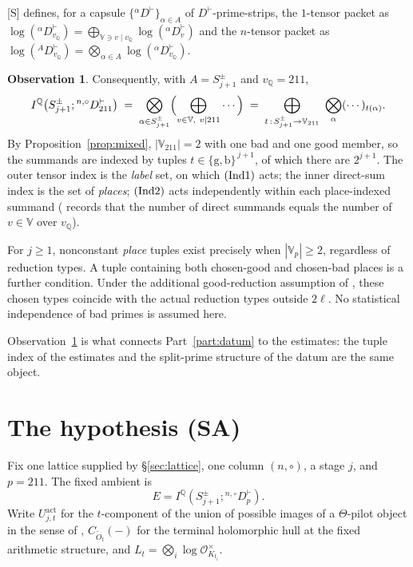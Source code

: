 \documentclass[11pt]{article}
\theoremstyle{plain}
\theoremstyle{definition}
\newtheorem{observation}[theorem]{Observation}
\newcommand{\VV}{\mathbb{V}}
\newcommand{\Ind}[1]{\textup{(Ind#1)}}
\newcommand{\SA}{\textup{(SA)}}
\begin{document}
[S] \cite[Proposition 3.2]{IUT3} defines, for a capsule $\{{}^\alpha D^\vdash\}_{\alpha\in A}$
of $D^\vdash$-prime-strips, the $1$-tensor packet as
$\log({}^\alpha D^\vdash_{v_{\mathbb{Q}}})=\bigoplus_{\VV\ni v\mid v_{\mathbb{Q}}}
\log({}^\alpha D^\vdash_v)$ and the $n$-tensor packet as
$\log({}^A D^\vdash_{v_{\mathbb{Q}}})=\bigotimes_{\alpha\in A}
\log({}^\alpha D^\vdash_{v_{\mathbb{Q}}})$.

\begin{observation}\label{obs:tuple}
Consequently, with $A=S^\pm_{j+1}$ and $v_{\mathbb{Q}}=211$,
\[
 I^{\mathbb{Q}}\bigl(S^\pm_{j+1};{}^{n,\circ}D^\vdash_{211}\bigr)
 \;=\;\bigotimes_{\alpha\in S^\pm_{j+1}}\Bigl(\bigoplus_{v\in\VV,\ v\mid211}\cdots\Bigr)
 \;=\;\bigoplus_{t\,:\,S^\pm_{j+1}\to\VV_{211}}\ \bigotimes_{\alpha}(\cdots)_{t(\alpha)} .
\]
By Proposition~\ref{prop:mixed}, $|\VV_{211}|=2$ with one bad and one good
member, so the summands are indexed by tuples
$t\in\{\mathrm{g},\mathrm{b}\}^{\,j+1}$, of which there are $2^{j+1}$.
The outer tensor index is the \emph{label} set, on which $\Ind1$ acts; the inner
direct-sum index is the set of \emph{places}; $\Ind2$ acts independently
within each place-indexed summand
(\cite[Theorem 3.11(i)]{IUT3} records that the number of direct summands equals
the number of $v\in\VV$ over $v_{\mathbb{Q}}$).
\end{observation}

For $j\ge1$, nonconstant \emph{place} tuples exist precisely when
$|\VV_p|\ge2$, regardless of reduction types.  A tuple containing both
chosen-good and chosen-bad places is a further condition.  Under the additional
good-reduction assumption of \cite[Theorem 1.10]{IUT4}, these chosen types
coincide with the actual reduction types outside $2\ell$.
No statistical independence of bad primes is assumed here.

Observation~\ref{obs:tuple} is what connects Part~\ref{part:datum} to the
estimates: the tuple index of the estimates and the split-prime structure of the
datum are the same object.

\section{The hypothesis \texorpdfstring{\SA}{(SA)}}\label{sec:sa}

Fix one lattice supplied by \S\ref{sec:lattice}, one column $(n,\circ)$,
a stage $j$, and $p=211$.  The fixed ambient is
\[
 E=I^{\mathbb{Q}}(S^\pm_{j+1};{}^{n,\circ}D^\vdash_{p}).
\]
Write $U^{\mathrm{act}}_{j,t}$ for the
$t$-component of the union of possible images of a $\Theta$-pilot object in the
sense of \cite[Corollary 3.12]{IUT3}, $C_{\widetilde O_t}(-)$ for the terminal
holomorphic hull at the fixed arithmetic structure, and
$L_t=\bigotimes_i\log\mathcal{O}_{K_{t_i}}^\times$.
\end{document}
